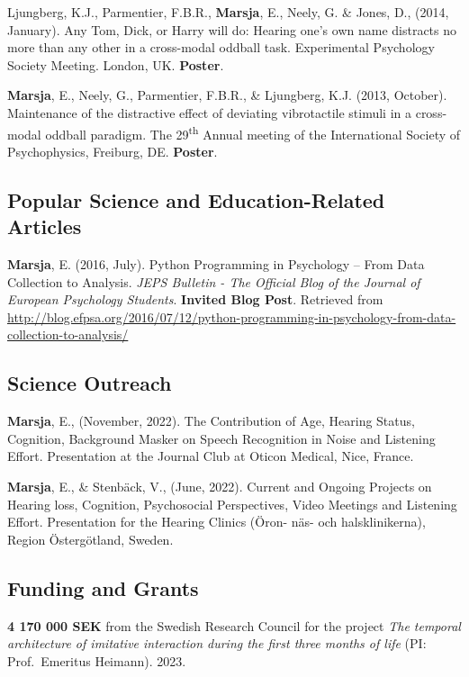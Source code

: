\documentclass[]{article}
\begin{document}
Ljungberg, K.J., Parmentier, F.B.R., \textbf{Marsja}, E., Neely, G. \&
Jones, D., (2014, January). Any Tom, Dick, or Harry will do: Hearing
one's own name distracts no more than any other in a cross-modal oddball
task. Experimental Psychology Society Meeting. London, UK.
\textbf{Poster}.

\textbf{Marsja}, E., Neely, G., Parmentier, F.B.R., \& Ljungberg, K.J.
(2013, October). Maintenance of the distractive effect of deviating
vibrotactile stimuli in a cross-modal oddball paradigm. The
29\textsuperscript{th} Annual meeting of the International Society of
Psychophysics, Freiburg, DE. \textbf{Poster}.

\subsection{Popular Science and Education-Related
Articles}\label{popular-science-and-education-related-articles}

\textbf{Marsja}, E. (2016, July). Python Programming in Psychology --
From Data Collection to Analysis. \emph{JEPS Bulletin - The Official
Blog of the Journal of European Psychology Students}. \textbf{Invited
Blog Post}. Retrieved from
\sloppy \url{http://blog.efpsa.org/2016/07/12/python-programming-in-psychology-from-data-collection-to-analysis/}

\subsection{Science Outreach}\label{science-outreach}

\textbf{Marsja}, E., (November, 2022). The Contribution of Age, Hearing
Status, Cognition, Background Masker on Speech Recognition in Noise and
Listening Effort. Presentation at the Journal Club at Oticon Medical,
Nice, France.

\textbf{Marsja}, E., \& Stenbäck, V., (June, 2022). Current and Ongoing
Projects on Hearing loss, Cognition, Psychosocial Perspectives, Video
Meetings and Listening Effort. Presentation for the Hearing Clinics
(Öron- näs- och halsklinikerna), Region Östergötland, Sweden.

\subsection{Funding and Grants}\label{funding-and-grants}

\textbf{4 170 000 SEK} from the Swedish Research Council for the project
\emph{The temporal architecture of imitative interaction during the
first three months of life} (PI: Prof.~Emeritus Heimann). 2023.
\end{document}
